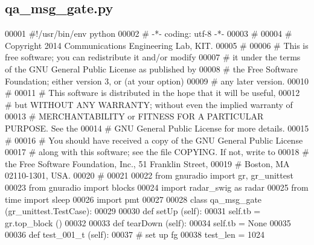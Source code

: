 \subsection{qa\+\_\+msg\+\_\+gate.\+py}
\label{qa__msg__gate_8py_source}

\begin{DoxyCode}
00001 \textcolor{comment}{#!/usr/bin/env python}
00002 \textcolor{comment}{# -*- coding: utf-8 -*-}
00003 \textcolor{comment}{# }
00004 \textcolor{comment}{# Copyright 2014 Communications Engineering Lab, KIT.}
00005 \textcolor{comment}{# }
00006 \textcolor{comment}{# This is free software; you can redistribute it and/or modify}
00007 \textcolor{comment}{# it under the terms of the GNU General Public License as published by}
00008 \textcolor{comment}{# the Free Software Foundation; either version 3, or (at your option)}
00009 \textcolor{comment}{# any later version.}
00010 \textcolor{comment}{# }
00011 \textcolor{comment}{# This software is distributed in the hope that it will be useful,}
00012 \textcolor{comment}{# but WITHOUT ANY WARRANTY; without even the implied warranty of}
00013 \textcolor{comment}{# MERCHANTABILITY or FITNESS FOR A PARTICULAR PURPOSE.  See the}
00014 \textcolor{comment}{# GNU General Public License for more details.}
00015 \textcolor{comment}{# }
00016 \textcolor{comment}{# You should have received a copy of the GNU General Public License}
00017 \textcolor{comment}{# along with this software; see the file COPYING.  If not, write to}
00018 \textcolor{comment}{# the Free Software Foundation, Inc., 51 Franklin Street,}
00019 \textcolor{comment}{# Boston, MA 02110-1301, USA.}
00020 \textcolor{comment}{# }
00021 
00022 \textcolor{keyword}{from} gnuradio \textcolor{keyword}{import} gr, gr\_unittest
00023 \textcolor{keyword}{from} gnuradio \textcolor{keyword}{import} blocks
00024 \textcolor{keyword}{import} radar\_swig \textcolor{keyword}{as} radar
00025 \textcolor{keyword}{from} time \textcolor{keyword}{import} sleep
00026 \textcolor{keyword}{import} pmt
00027 
00028 \textcolor{keyword}{class }qa_msg_gate (gr\_unittest.TestCase):
00029 
00030     \textcolor{keyword}{def }setUp (self):
00031         self.tb = gr.top\_block ()
00032 
00033     \textcolor{keyword}{def }tearDown (self):
00034         self.tb = \textcolor{keywordtype}{None}
00035 
00036     \textcolor{keyword}{def }test_001_t (self):
00037         \textcolor{comment}{# set up fg}
00038         test\_len = 1024

\end{DoxyCode}

